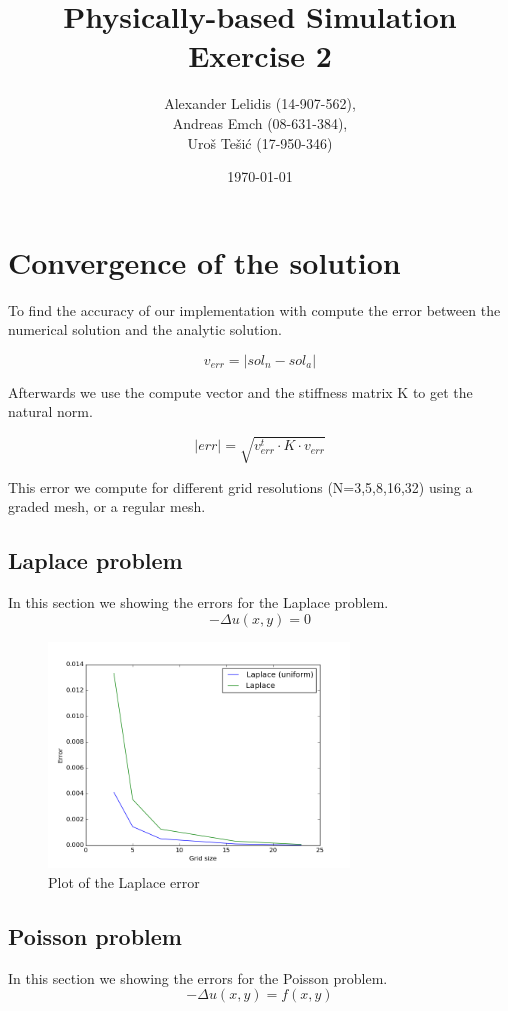 \documentclass{article}
\title{Physically-based Simulation \\ Exercise 2}
\author{ 
    Alexander Lelidis (14-907-562), \\
    Andreas Emch (08-631-384), \\
    Uro\v{s} Te\v{s}i\'{c} (17-950-346)
}
\date{\today}
\begin{document}
\maketitle

\section{Convergence of the solution}
To find the accuracy of our implementation with compute the error between the numerical solution and the analytic solution.

\begin{equation}
v_{err} =|sol_n - sol_a|
\end{equation}

Afterwards we use the compute vector and the stiffness matrix K to get the natural norm.

\begin{equation}
|err| =\sqrt{v_{err}^t \cdot K \cdot v_{err}}
\end{equation}

This error we compute for different grid resolutions (N=3,5,8,16,32) using a graded mesh, or a regular mesh.

\newpage


\subsection{Laplace problem}
In this section we showing the errors for the Laplace problem.
\begin{equation}
- \Delta u(x,y) = 0
\end{equation}

\begin{figure}[!h]
\caption{Plot of the Laplace error}
\includegraphics[width=8cm]{laplace}
\centering
\end{figure}

\newpage


\subsection{Poisson problem}
In this section we showing the errors for the Poisson problem.
\begin{equation}
- \Delta u(x,y) = f(x,y)
\end{equation}
\end{document}
